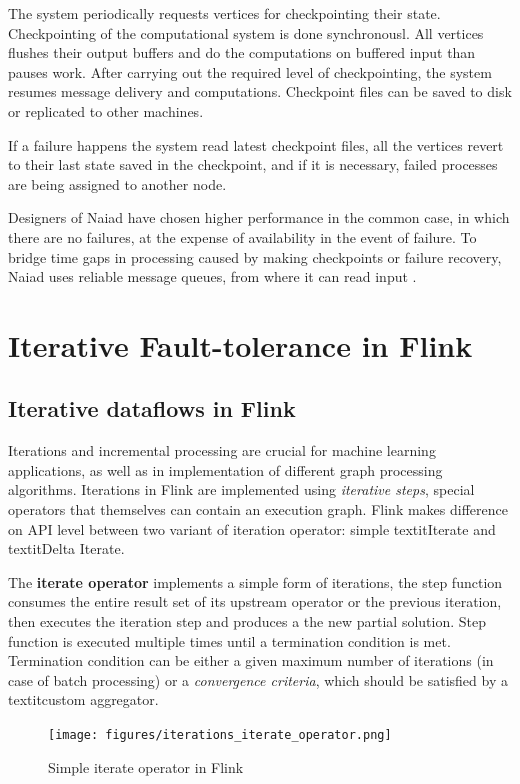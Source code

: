 The system periodically requests vertices for checkpointing their state. Checkpointing of the computational system is done synchronousl. All vertices flushes their output buffers and do the computations on buffered input than pauses work. After carrying out the required level of checkpointing, the system resumes message delivery and computations. Checkpoint files can be saved to disk or replicated to other machines.

If a failure happens the system read latest checkpoint files, all the vertices revert to their last state saved in the checkpoint, and if it is necessary, failed processes are being assigned to another node.

Designers of Naiad have chosen higher performance in the common case, in which there are no failures, at the expense of availability in the event of failure. To bridge time gaps in processing caused by making checkpoints or failure recovery, Naiad uses reliable message queues, from where it can read input . 

\section{Iterative Fault-tolerance in Flink}\label{iftf}
\subsection{Iterative dataflows in Flink}
Iterations and incremental processing are crucial for machine learning applications, as well as in implementation of different graph processing algorithms. Iterations in Flink are implemented using \textit{iterative steps}, special operators that themselves can contain an execution graph. Flink makes difference on API level between two variant of iteration operator: simple textit{Iterate} and textit{Delta Iterate}.

The \textbf{iterate operator} implements a simple form of iterations, the step function consumes the entire result set of its upstream operator or the previous iteration, then executes the iteration step and produces a the new partial solution. Step function is executed multiple times until a termination condition is met. Termination condition can be either a given maximum number of iterations (in case of batch processing) or a \textit{convergence criteria}, which should be satisfied by a textit{custom aggregator}.
\begin{figure}[!ht]
  \centering    
      \texttt{[image: figures/iterations\_iterate\_operator.png]}
  \caption{Simple iterate operator in Flink\cite{flink_doc_iteration}}
  \label{fig:iterations_iterate_operator}
\end{figure}

